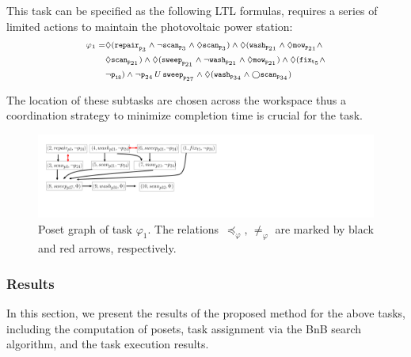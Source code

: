 This task can be specified as the following LTL formulas, 
requires a series of limited actions to 
maintain the photovoltaic power station:
\begin{equation}\scriptsize
\label{eq:task1}
  \begin{aligned}
\varphi_1 = & \Diamond(\texttt{repair}_{\texttt{p}_{3}} \wedge \lnot \texttt{scan}_{\texttt{p}_3} \wedge\Diamond \texttt{scan}_{\texttt{p}_3})
\wedge \Diamond (\texttt{wash}_{\texttt{p}_{21}} \wedge 
\Diamond \texttt{mow}_{\texttt{p}_{21}} \wedge  \\
&\Diamond\texttt{scan}_{\texttt{p}_{21}}) \wedge \Diamond ( \texttt{sweep}_{\texttt{p}_{21}} \wedge
 \lnot \texttt{wash}_{\texttt{p}_{21}} \wedge\Diamond \texttt{mow}_{\texttt{p}_{21}}) \wedge \Diamond(\texttt{fix}_{\texttt{t}_5} \wedge \\
& \lnot \texttt{p}_{\texttt{18}}) \wedge \lnot \texttt{p}_{24} \,U \, \texttt{sweep}_{\texttt{p}_{27}} 
\wedge \Diamond (\texttt{wash}_{\texttt{p}_{34}} \wedge \bigcirc \texttt{scan}_{\texttt{p}_{34}})
\end{aligned}
\end{equation}

The location of these subtasks are chosen across the workspace
thus a coordination strategy to minimize completion time is crucial for the task.



\begin{figure}[t!] 
		\centering%
		\includegraphics[height = 0.12 \textwidth]{figures/simulation/taskfinal/ipe_poset_graph.pdf}
	\caption{Poset graph of task $\varphi_1$.
          The relations~$\preceq_\varphi,\, \neq_{\varphi}$ are marked
          by black and red arrows, respectively.}
       \label{fig:task12-posets}
\end{figure}

\subsubsection{Results}\label{subsubsec:results}
In this section, we present the results of the proposed method for
the above tasks, including the computation of posets,
task assignment via the BnB search algorithm, and the task execution results.

